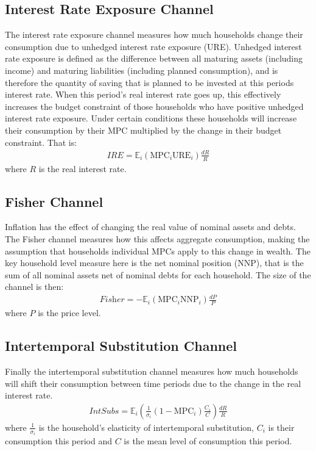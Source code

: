 \documentclass[12pt,a4paper]{article}
\begin{document}
\subsection{Interest Rate Exposure Channel}
The interest rate exposure channel measures how much households change their consumption due to unhedged interest rate exposure (URE). Unhedged interest rate exposure is defined as the difference between all maturing assets (including income) and maturing liabilities (including planned consumption), and is therefore the quantity of saving that is planned to be invested at this periods interest rate. When this period's real interest rate goes up, this effectively increases the budget constraint of those households who have positive unhedged interest rate exposure. Under certain conditions these households will increase their consumption by their MPC multiplied by the change in their budget constraint. That is:
\begin{align}
\textit{IRE} = \mathbb{E}_i \left( \text{MPC}_i \text{URE}_i  \right) \frac{dR}{R}
\end{align}
where $R$ is the real interest rate.

\subsection{Fisher Channel}
Inflation has the effect of changing the real value of nominal assets and debts. The Fisher channel measures how this affects aggregate consumption, making the assumption that households individual MPCs apply to this change in wealth. The key household level measure here is the net nominal position (NNP), that is the sum of all nominal assets net of nominal debts for each household. The size of the channel is then:
\begin{align}
\textit{Fisher} = -\mathbb{E}_i \left( \text{MPC}_i \text{NNP}_i  \right) \frac{dP}{P}
\end{align}
where $P$ is the price level.

\subsection{Intertemporal Substitution Channel}
Finally the intertemporal substitution channel measures how much households will shift their consumption between time periods due to the change in the real interest rate.
\begin{align}
\textit{IntSubs} = \mathbb{E}_i \left( \frac{1}{\sigma_i} (1-\text{MPC}_i) \frac{C_i}{C}  \right) \frac{dR}{R}
\end{align}
where $\frac{1}{\sigma_i}$ is the household's elasticity of intertemporal substitution, $C_i$ is their consumption this period and $C$ is the mean level of consumption this period.
\end{document}
